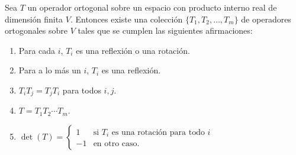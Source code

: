 \begin{corolario}
    Sea $T$ un operador ortogonal sobre un espacio con producto interno real de dimensión finita $V$. Entonces existe una colección $\{T_1,T_2,\dots,T_m\}$ de operadores ortogonales sobre $V$ tales que se cumplen las siguientes afirmaciones:
    \begin{enumerate}[label=(\alph*)]
        \item Para cada $i$, $T_i$ es una reflexión o una rotación.
        \item Para a lo más un $i$, $T_i$ es una reflexión.
        \item $T_iT_j=T_jT_i$ para todos $i,j$.
        \item $T=T_1T_2\cdots T_m$.
        \item $\det(T)=\begin{cases}1&\text{si }T_i\text{ es una rotación para todo }i\\-1&\text{en otro caso.}\end{cases}$
    \end{enumerate}
\end{corolario}

